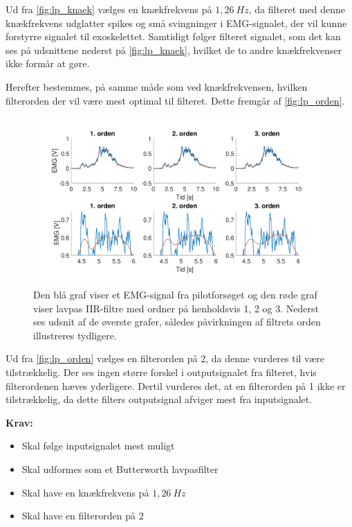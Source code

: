 \noindent
Ud fra \autoref{fig:lp_knaek} vælges en knækfrekvens på $1,26~Hz$, da filteret med denne knækfrekvens udglatter spikes og små svingninger i EMG-signalet, der vil kunne forstyrre signalet til exoskelettet. 
Samtidigt følger filteret signalet, som det kan ses på udsnittene nederst på \autoref{fig:lp_knaek}, hvilket de to andre knækfrekvenser ikke formår at gøre.

Herefter bestemmes, på samme måde som ved knækfrekvensen, hvilken filterorden der vil være mest optimal til filteret. Dette fremgår af \autoref{fig:lp_orden}.

\begin{figure} [H]
\centering
\includegraphics[width=1.0\textwidth]{figures/problemloesning/lavpas_orden.pdf}
\caption{Den blå graf viser et EMG-signal fra pilotforsøget og den røde graf viser lavpas IIR-filtre med ordner på henholdsvis 1, 2 og 3. Nederst ses udsnit af de øverste grafer, således påvirkningen af filtrets orden illustreres tydligere.}
\label{fig:lp_orden}
\end{figure} 

\noindent
Ud fra \autoref{fig:lp_orden} vælges en filterorden på 2, da denne vurderes til være tilstrækkelig. 
Der ses ingen større forskel i outputsignalet fra filteret, hvis filterordenen hæves yderligere. 
Dertil vurderes det, at en filterorden på 1 ikke er tilstrækkelig, da dette filters outputsignal afviger mest fra inputsignalet. 

\vspace{3mm}

\textbf{Krav:}
\begin{itemize}
\item Skal følge inputsignalet mest muligt  
\item Skal udformes som et Butterworth lavpasfilter
\item Skal have en knækfrekvens på $1,26~Hz$
\item Skal have en filterorden på 2
\end{itemize}

